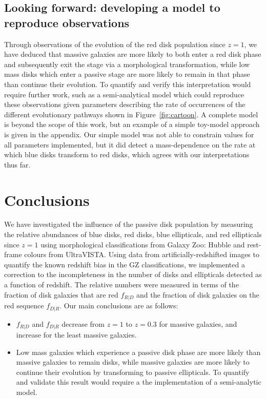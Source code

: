 \documentclass[useAMS,usenatbib]{mn2e}
\begin{document}
\subsection{Looking forward: developing a model to reproduce observations}

Through observations of the evolution of the red disk population since $z=1$, we have deduced that massive galaxies are more likely to both enter a red disk phase and subsequently exit the stage via a morphological transformation, while low mass disks which enter a passive stage are more likely to remain in that phase than continue their evolution. To quantify and verify this interpretation would require further work, such as a semi-analytical model which could reproduce these observations given parameters describing the rate of occurrences of the different evolutionary pathways shown in Figure~\ref{fig:cartoon}. A complete model is beyond the scope of this work, but an example of a simple toy-model approach is given in the appendix. Our simple model was not able to constrain values for all parameters implemented, but it did detect a mass-dependence on the rate at which blue disks transform to red disks, which agrees with our interpretations thus far. 

\section{Conclusions}
\label{sec:conclusions}

We have investigated the influence of the passive disk population by measuring the relative abundances of blue disks, red disks, blue ellipticals, and red ellipticals since $z=1$ using morphological classifications from Galaxy Zoo: Hubble and rest-frame colours from UltraVISTA. Using data from artificially-redshifted  images to quantify the known redshift bias in the GZ classifications, we implemented a correction to the incompleteness in the number of disks and ellipticals detected as a function of redshift. The relative numbers were measured in terms of the fraction of disk galaxies that are red $f_{R|D}$ and the fraction of disk galaxies on the red sequence $f_{D|R}$. Our main conclusions are as follows:

\begin{itemize}

\item{$f_{R|D}$ and $f_{D|R}$ decrease from $z=1$ to $z=0.3$ for massive galaxies, and increase for the least massive galaxies.}

\item{Low mass galaxies which experience a passive disk phase are more likely than massive galaxies to remain disks, while massive galaxies are more likely to continue their evolution by transforming to passive ellipticals. To quantify and validate this result would require a the implementation of a semi-analytic model.}


\end{itemize}
\end{document}
